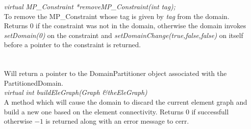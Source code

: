 {\em virtual MP\_Constraint *removeMP\_Constraint(int tag);} \\
To remove the MP\_Constraint whose tag is given by {\em tag} from the
domain. Returns $0$ if the constraint was not in the domain, otherwise
the domain invokes {\em setDomain(0)} on the constraint and {\em
setDomainChange(true,false,false)} on itself before a pointer to the
constraint is returned.\\  




  \\
 \\
Will return a pointer to the DomainPartitioner object associated with the
PartitionedDomain. \\

{\em virtual int buildEleGraph(Graph \&theEleGraph)} \\
A method which will cause the domain to discard the current element
graph and build a new one based on the element connectivity. Returns
$0$ if successfull otherwise $-1$ is returned along with an error
message to cerr. \\
